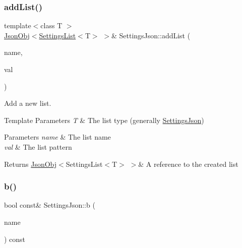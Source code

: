 \subsubsection{\texorpdfstring{add\+List()}{addList()}}
{\footnotesize\ttfamily template$<$class T $>$ \\
\hyperlink{class_json_obj}{Json\+Obj}$<$\hyperlink{class_settings_list}{Settings\+List}$<$T$>$ $>$\& Settings\+Json\+::add\+List (\begin{DoxyParamCaption}\item[{std\+::string const \&}]{name,  }\item[{T $\ast$}]{val }\end{DoxyParamCaption})\hspace{0.3cm}{\ttfamily [inline]}}



Add a new list. 


\begin{DoxyTemplParams}{Template Parameters}
{\em T} & The list type (generally \hyperlink{class_settings_json}{Settings\+Json}) \\
\hline
\end{DoxyTemplParams}

\begin{DoxyParams}{Parameters}
{\em name} & The list name \\
\hline
{\em val} & The list pattern \\
\hline
\end{DoxyParams}
\begin{DoxyReturn}{Returns}
\hyperlink{class_json_obj}{Json\+Obj}$<$Settings\+List$<$\+T$>$ $>$\& A reference to the created list 
\end{DoxyReturn}
\mbox{\label{class_settings_json_a347ec6bd738a36b96b2eccab0bae5a32}} 
\subsubsection{\texorpdfstring{b()}{b()}\hspace{0.1cm}{\footnotesize\ttfamily [1/2]}}
{\footnotesize\ttfamily bool const\& Settings\+Json\+::b (\begin{DoxyParamCaption}\item[{std\+::string const \&}]{name }\end{DoxyParamCaption}) const\hspace{0.3cm}{\ttfamily [inline]}}



